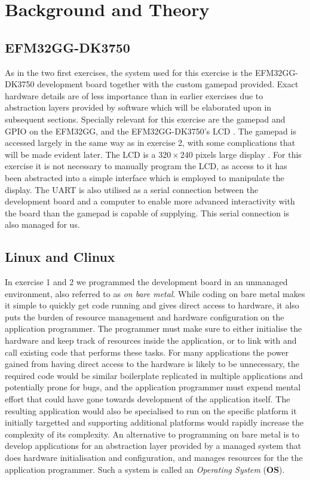 \chapter{Background and Theory}

\section{EFM32GG-DK3750}

As in the two first exercises, the system used for this exercise is the
EFM32GG-DK3750 development board together with the custom gamepad provided.
Exact hardware details are of less importance than in earlier exercises due to
abstraction layers provided by software which will be elaborated upon in
subsequent sections. Specially relevant for this exercise are the gamepad and
GPIO on the EFM32GG, and the EFM32GG-DK3750's LCD \cite{TDT4528Compendium}. The gamepad is
accessed largely in the same way as in exercise 2, with some complications that
will be made evident later. The LCD is a \(320 \times 240\) pixels large display
\cite{TDT4528Compendium}. For this exercise it is not necessary to manually program the
LCD, as access to it has been abstracted into a simple interface which is
employed to manipulate the display. The UART is also utilised as a serial
connection between the development board and a computer to enable more advanced
interactivity with the board than the gamepad is capable of supplying. This
serial connection is also managed for us.

\section{Linux and \textmu Clinux}

In exercise 1 and 2 we programmed the development board in an unmanaged
environment, also referred to as \emph{on bare metal}. While coding on bare
metal makes it simple to quickly get code running and gives direct access to
hardware, it also puts the burden of resource management and hardware
configuration on the application programmer. The programmer must make sure to
either initialise the hardware and keep track of resources inside the
application, or to link with and call existing code that performs these tasks.
For many applications the power gained from having direct access to the hardware
is likely to be unnecessary, the required code would be similar boilerplate
replicated in multiple applications and potentially prone for bugs, and the
application programmer must expend mental effort that could have gone towards
development of the application itself. The resulting application would also be
specialised to run on the specific platform it initially targetted and
supporting additional platforms would rapidly increase the complexity of its
complexity. An alternative to programming on bare metal is to develop
applications for an abstraction layer provided by a managed system that does
hardware initialisation and configuration, and manages resources for the the
application programmer. Such a system is called an \emph{Operating System}
(\textbf{OS}).


